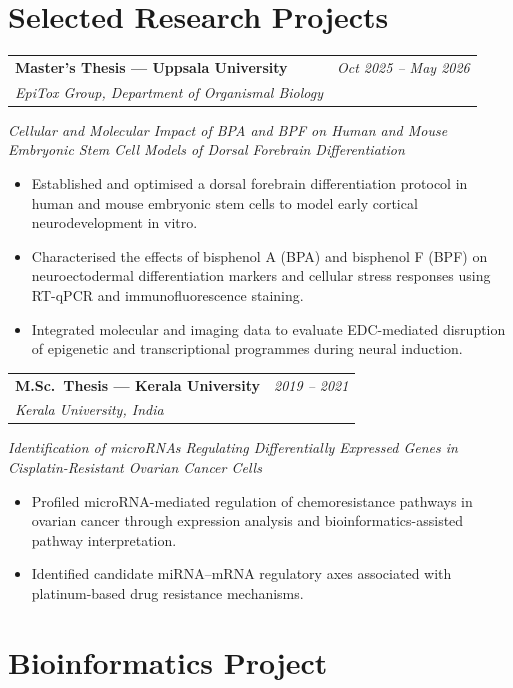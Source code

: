\documentclass[10pt, a4paper]{article}
\makeatletter
\newcommand{\entry}[3]{%
  \begin{tabularx}{\linewidth}{@{}X r@{}}
    \textbf{#1} & \textit{#3} \\
    \textit{#2} & \\
  \end{tabularx}%
}
\makeatother
\begin{document}
\section{Selected Research Projects}

\entry{Master's Thesis --- Uppsala University}{EpiTox Group, Department of Organismal Biology}{Oct 2025 -- May 2026}
\vspace{2pt}
\textit{Cellular and Molecular Impact of BPA and BPF on Human and Mouse Embryonic Stem Cell
Models of Dorsal Forebrain Differentiation}
\begin{itemize}
  \item Established and optimised a dorsal forebrain differentiation protocol in human
        and mouse embryonic stem cells to model early cortical neurodevelopment in vitro.
  \item Characterised the effects of bisphenol A (BPA) and bisphenol F (BPF) on
        neuroectodermal differentiation markers and cellular stress responses using
        RT-qPCR and immunofluorescence staining.
  \item Integrated molecular and imaging data to evaluate EDC-mediated disruption of
        epigenetic and transcriptional programmes during neural induction.
\end{itemize}

\vspace{5pt}

\entry{M.Sc.\ Thesis --- Kerala University}{Kerala University, India}{2019 -- 2021}
\textit{Identification of microRNAs Regulating Differentially Expressed Genes in
Cisplatin-Resistant Ovarian Cancer Cells}
\begin{itemize}
  \item Profiled microRNA-mediated regulation of chemoresistance pathways in ovarian
        cancer through expression analysis and bioinformatics-assisted pathway
        interpretation.
  \item Identified candidate miRNA--mRNA regulatory axes associated with platinum-based
        drug resistance mechanisms.
\end{itemize}

\vspace{2pt}

\section{Bioinformatics Project}
\end{document}
